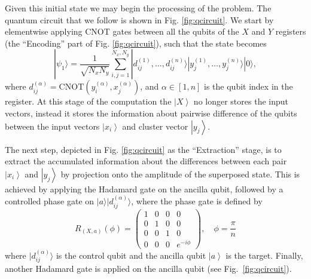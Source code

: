 \documentclass[%
  pra, aps, physrev,
  showkeys,
  twocolumn,
  showpacs,
  superscriptaddress,
  amsmath,amssymb,
  10pt
]{revtex4-2}
\begin{document}
Given this initial state we may begin the processing of the problem.  The quantum circuit that we follow is shown in Fig. \ref{fig:qcircuit}. We start by elementwise applying CNOT gates between all the qubits of the $X$ and $Y$ registers (the ``Encoding'' part of Fig. \ref{fig:qcircuit}), such that the state becomes
%
\begin{equation}
    | \psi_1 \rangle  =
    \frac{1}{\sqrt{N_x N_y}} \sum_{i, j=1}^{N_x,N_y}
    | d^{(1)}_{ij}, \dots, d^{(n)}_{ij} \rangle
    | y^{(1)}_j, \dots, y^{(n)}_j \rangle
    | 0 \rangle ,
\end{equation}
%
where $d^{(\alpha)}_{ij} = \mathrm{CNOT}(y^{(\alpha)}_i, x^{(\alpha)}_j)$, and $\alpha \in  [1,n]$  is the qubit index in the register.
At this stage of the computation the $\left| X \right\rangle$ no longer stores the input vectors,
instead it stores the information about pairwise difference of the qubits between the input vectors $\left| x_i \right\rangle$ and cluster vector $\left| y_j \right\rangle$.

The next step, depicted in Fig. \ref{fig:qcircuit} as the ``Extraction'' stage, is to extract the accumulated information about the differences between each pair $\left| x_i \right\rangle$ and $\left| y_j \right\rangle$ by projection onto the amplitude of the superposed state. This is achieved by applying the Hadamard gate on the ancilla qubit, followed by a controlled phase gate on $ | a \rangle  |d_{ij}^{(\alpha)} \rangle$, where the phase gate is defined by
\begin{equation}
    \label{eq:controled_phase_rotation}
    R_{(X,a)}(\phi) =
    \begin{pmatrix}
        1 & 0 & 0 & 0 \\
        0 & 1 & 0 & 0 \\
        0 & 0 & 1 & 0 \\
        0 & 0 & 0 & e^{-i\phi}
    \end{pmatrix} ,
    \quad \phi = \frac{\pi}{n}
\end{equation}
%
where $ | d_{ij}^{(\alpha)} \rangle $ is the control qubit and the ancilla qubit $\left| a \right\rangle$ is the target. Finally, another Hadamard gate is applied on the ancilla qubit (see Fig.~\ref{fig:qcircuit}).
\end{document}
